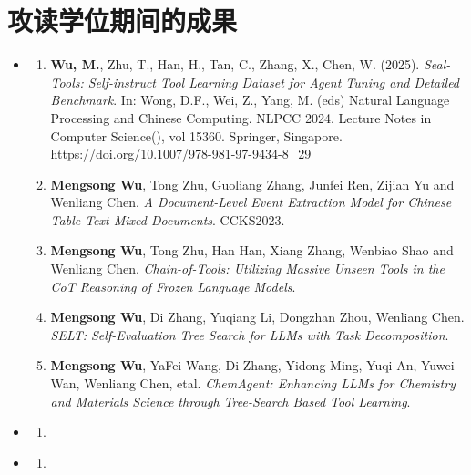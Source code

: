 \chapter*{攻读学位期间的成果}
{}
\begin{itemize}
	 \setlength{\parsep}{2em}
	\item \textbf{\heiti{}}
	      \begin{enumerate}
	      	\setlength{\itemsep}{-\itemsep}  %
	      	
	      	      
        \item \textbf{Wu, M.}, Zhu, T., Han, H., Tan, C., Zhang, X., Chen, W. (2025). \emph{Seal-Tools: Self-instruct Tool Learning Dataset for Agent Tuning and Detailed Benchmark}. In: Wong, D.F., Wei, Z., Yang, M. (eds) Natural Language Processing and Chinese Computing. NLPCC 2024. Lecture Notes in Computer Science(), vol 15360. Springer, Singapore. https://doi.org/10.1007/978-981-97-9434-8\_29
        \item \textbf{Mengsong Wu}, Tong Zhu, Guoliang Zhang, Junfei Ren, Zijian Yu and Wenliang Chen. \emph{A Document-Level Event Extraction Model for Chinese Table-Text Mixed Documents}. CCKS2023.
        \item \textbf{Mengsong Wu}, Tong Zhu, Han Han, Xiang Zhang, Wenbiao Shao and Wenliang Chen. \emph{Chain-of-Tools: Utilizing Massive Unseen Tools in the CoT Reasoning of Frozen Language Models}.
        \item \textbf{Mengsong Wu}, Di Zhang, Yuqiang Li, Dongzhan Zhou, Wenliang Chen. \emph{SELT: Self-Evaluation Tree Search for LLMs with Task Decomposition}.
        \item \textbf{Mengsong Wu}, YaFei Wang, Di Zhang, Yidong Ming, Yuqi An, Yuwei Wan, Wenliang Chen, etal. \emph{ChemAgent: Enhancing LLMs for Chemistry and Materials Science through Tree-Search Based Tool Learning}.
	      	      
	      \end{enumerate}
	      
 		\item \textbf{\heiti{}}
	      \begin{enumerate}
	      	\item 
	      \end{enumerate}
	      
		\item \textbf{\heiti{}}
	      \begin{enumerate}
	      	\item 
	      \end{enumerate}

\end{itemize}

